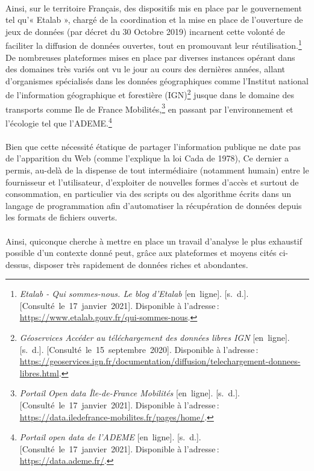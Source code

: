 \documentclass[
  11pt,
  french,
]{article}
\begin{document}
~\\
Ainsi, sur le territoire Français, des dispositifs mis en place par le
gouvernement tel qu'« Etalab », chargé de la coordination et la mise en
place de l'ouverture de jeux de données (par décret du 30 Octobre 2019)
incarnent cette volonté de faciliter la diffusion de données ouvertes,
tout en promouvant leur réutilisation.\footnote{\emph{Etalab - Qui
  sommes-nous. Le blog d'Etalab} {[}en~ligne{]}. {[}s.~d.{]}.
  {[}Consulté~le~17~janvier~2021{]}. Disponible à l'adresse\,:
  \url{https://www.etalab.gouv.fr/qui-sommes-nous}.} De nombreuses
plateformes mises en place par diverses instances opérant dans des
domaines très variés ont vu le jour au cours des dernières années,
allant d'organismes spécialisés dans les données géographiques comme
l'Institut national de l'information géographique et forestière
(IGN)\footnote{\emph{Géoservices \textbar{} Accéder au téléchargement
  des données libres IGN} {[}en~ligne{]}. {[}s.~d.{]}.
  {[}Consulté~le~15~septembre~2020{]}. Disponible à l'adresse\,:
  \url{https://geoservices.ign.fr/documentation/diffusion/telechargement-donnees-libres.html}.}
jusque dans le domaine des transports comme Ile de France
Mobilités,\footnote{\emph{Portail Open data Île-de-France Mobilités}
  {[}en~ligne{]}. {[}s.~d.{]}. {[}Consulté~le~17~janvier~2021{]}.
  Disponible à l'adresse\,:
  \url{https://data.iledefrance-mobilites.fr/pages/home/}.} en passant
par l'environnement et l'écologie tel que l'ADEME.\footnote{\emph{Portail
  open data de l'ADEME} {[}en~ligne{]}. {[}s.~d.{]}.
  {[}Consulté~le~17~janvier~2021{]}. Disponible à l'adresse\,:
  \url{https://data.ademe.fr/}.}\\
~\\
Bien que cette nécessité étatique de partager l'information publique ne
date pas de l'apparition du Web (comme l'explique la loi Cada de 1978),
Ce dernier a permis, au-delà de la dispense de tout intermédiaire
(notamment humain) entre le fournisseur et l'utilisateur, d'exploiter de
nouvelles formes d'accès et surtout de consommation, en particulier via
des scripts ou des algorithme écrits dans un langage de programmation
afin d'automatiser la récupération de données depuis les formats de
fichiers ouverts.\\
~\\
Ainsi, quiconque cherche à mettre en place un travail d'analyse le plus
exhaustif possible d'un contexte donné peut, grâce aux plateformes et
moyens cités ci-dessus, disposer très rapidement de données riches et
abondantes.\\
\end{document}
